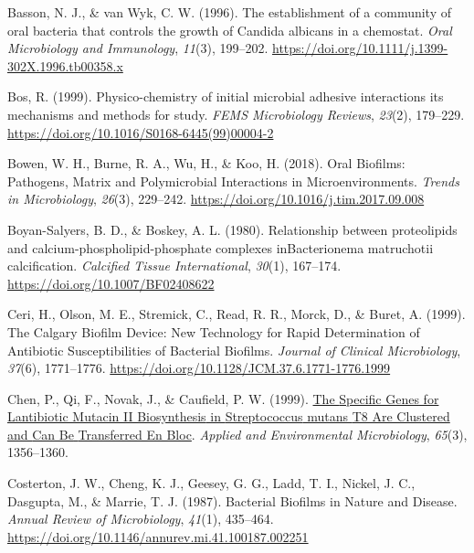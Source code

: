\documentclass[
  b5paper,
]{book}
\newlength{\cslhangindent}
\newenvironment{CSLReferences}[2] %
 {\begin{list}{}{%
  \setlength{\itemindent}{0pt}
  \setlength{\leftmargin}{0pt}
  \setlength{\parsep}{0pt}
  \ifodd #1
   \setlength{\leftmargin}{\cslhangindent}
   \setlength{\itemindent}{-1\cslhangindent}
  \fi
  \setlength{\itemsep}{#2\baselineskip}}}
 {\end{list}}
\begin{document}
\label{refs-2}
\begin{CSLReferences}{1}{0}
Basson, N. J., \& van Wyk, C. W. (1996). The establishment of a
community of oral bacteria that controls the growth of {Candida}
albicans in a chemostat. \emph{Oral Microbiology and Immunology},
\emph{11}(3), 199--202.
\url{https://doi.org/10.1111/j.1399-302X.1996.tb00358.x}

Bos, R. (1999). Physico-chemistry of initial microbial adhesive
interactions \textendash{} its mechanisms and methods for study.
\emph{FEMS Microbiology Reviews}, \emph{23}(2), 179--229.
\url{https://doi.org/10.1016/S0168-6445(99)00004-2}

Bowen, W. H., Burne, R. A., Wu, H., \& Koo, H. (2018). Oral {Biofilms}:
{Pathogens}, {Matrix} and {Polymicrobial Interactions} in
{Microenvironments}. \emph{Trends in Microbiology}, \emph{26}(3),
229--242. \url{https://doi.org/10.1016/j.tim.2017.09.008}

Boyan-Salyers, B. D., \& Boskey, A. L. (1980). Relationship between
proteolipids and calcium-phospholipid-phosphate complexes
{inBacterionema} matruchotii calcification. \emph{Calcified Tissue
International}, \emph{30}(1), 167--174.
\url{https://doi.org/10.1007/BF02408622}

Ceri, H., Olson, M. E., Stremick, C., Read, R. R., Morck, D., \& Buret,
A. (1999). The {Calgary Biofilm Device}: {New Technology} for {Rapid
Determination} of {Antibiotic Susceptibilities} of {Bacterial Biofilms}.
\emph{Journal of Clinical Microbiology}, \emph{37}(6), 1771--1776.
\url{https://doi.org/10.1128/JCM.37.6.1771-1776.1999}

Chen, P., Qi, F., Novak, J., \& Caufield, P. W. (1999).
\href{https://www.ncbi.nlm.nih.gov/pmc/articles/PMC91190}{The {Specific
Genes} for {Lantibiotic Mutacin II Biosynthesis} in {Streptococcus}
mutans {T8 Are Clustered} and {Can Be} {Transferred En Bloc}}.
\emph{Applied and Environmental Microbiology}, \emph{65}(3), 1356--1360.

Costerton, J. W., Cheng, K. J., Geesey, G. G., Ladd, T. I., Nickel, J.
C., Dasgupta, M., \& Marrie, T. J. (1987). Bacterial {Biofilms} in
{Nature} and {Disease}. \emph{Annual Review of Microbiology},
\emph{41}(1), 435--464.
\url{https://doi.org/10.1146/annurev.mi.41.100187.002251}


\end{CSLReferences}
\end{document}
